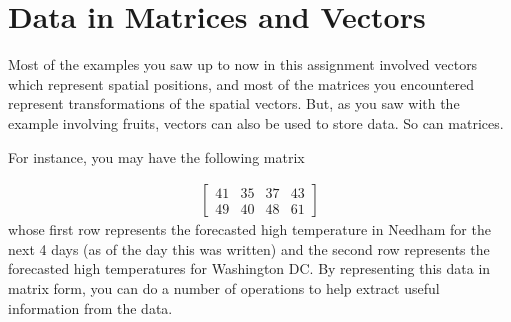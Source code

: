 \section{Data in Matrices and Vectors}

Most of the examples you saw up to now in this assignment involved vectors which represent spatial positions, and most of the matrices you encountered represent transformations of the spatial vectors. But, as you saw with the example involving fruits, vectors can also be used to store data. So can matrices.

For instance, you may have the following matrix

\begin{align}
\begin{bmatrix}
41 & 35 & 37 & 43 \\
49 & 40 & 48 & 61
\end{bmatrix}
\end{align}
whose first row represents the forecasted high temperature in Needham for the next 4 days (as of the day this was written) and the second row represents the forecasted high temperatures for Washington DC. By representing this data in matrix form, you can do a number of operations to help extract useful information from the data.


